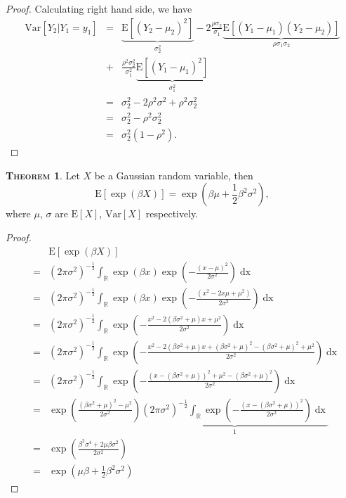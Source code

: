 \documentclass[a4paper, twoside, 11pt]{article}
\theoremstyle{definition}
\newtheorem{theorem}[definition]{\scshape Theorem}
\newcommand{\brkt}[1]{\left({#1} \right)}
\begin{document}
\begin{proof}
  Calculating right hand side, we have
  \begin{eqnarray*}
	\mathrm{Var}[Y_2|Y_1=y_1] &=&\underbrace{\mathrm{E}[(Y_2 - \mu_2)^2]}_{\sigma_2^2} - 2\frac{\rho\sigma_2}{\sigma_1}\underbrace{\mathrm{E}[(Y_1 -\mu_1)(Y_2 - \mu_2)]}_{\rho\sigma_1\sigma_2}\\
	&+& \frac{\rho^2\sigma_2^2}{\sigma_1^2}\underbrace{\mathrm{E}[(Y_1-\mu_1)^2]}_{\sigma_1^2}\\
	&=& \sigma_2^2 - 2\rho^2\sigma^2 + \rho^2\sigma_2^2\\
	&=& \sigma_2^2 - \rho^2\sigma_2^2\\
	&=& \sigma_2^2(1-\rho^2).
  \end{eqnarray*} 
  \end{proof}

  \begin{theorem}
	Let $X$ be a Gaussian random variable, then
	\begin{equation}
	  \mathrm{E}[\exp(\beta X)] = \exp(\beta\mu + \frac{1}{2}\beta^2\sigma^2),
	  \label{sec:expgau}
	\end{equation}
	where $\mu$, $\sigma$ are $\mathrm{E}[X]$, $\mathrm{Var}[X]$ respectively.
  \end{theorem}
  \begin{proof}
  \begin{eqnarray*}
	&&\mathrm{E}[\exp(\beta X)] \\
  &=& (2\pi \sigma^2)^{-\frac{1}{2}}\int_\mathbb{R} \exp(\beta x) \exp\brkt{-\frac{(x-\mu)^2}{2\sigma^2}} \mathop{dx}\\
  &=& (2\pi \sigma^2)^{-\frac{1}{2}}\int_\mathbb{R} \exp(\beta x) \exp\brkt{-\frac{(x^2- 2x\mu+ \mu^2)}{2\sigma^2}} \mathop{dx}\\
  &=& (2\pi \sigma^2)^{-\frac{1}{2}}\int_\mathbb{R} \exp\brkt{-\frac{x^2- 2(\beta\sigma^2+\mu)x+ \mu^2}{2\sigma^2}} \mathop{dx}\\
  &=& (2\pi \sigma^2)^{-\frac{1}{2}}\int_\mathbb{R} \exp\brkt{-\frac{x^2- 2(\beta\sigma^2+\mu)x+ (\beta\sigma^2+\mu)^2 -  (\beta\sigma^2+\mu)^2 + \mu^2}{2\sigma^2}} \mathop{dx}\\
  &=& (2\pi \sigma^2)^{-\frac{1}{2}}\int_\mathbb{R} \exp\brkt{-\frac{(x- (\beta\sigma^2+\mu))^2+ \mu^2 - (\beta\sigma^2+\mu)^2}{2\sigma^2}} \mathop{dx}\\
  &=& \exp\brkt{\frac{(\beta\sigma^2+\mu)^2 - \mu^2}{2\sigma^2}} \underbrace{(2\pi \sigma^2)^{-\frac{1}{2}}\int_\mathbb{R} \exp\brkt{-\frac{(x- (\beta\sigma^2+\mu))^2}{2\sigma^2}}\mathop{dx}}_{1}\\
  &=& \exp\brkt{\frac{\beta^2\sigma^4 + 2\mu\beta\sigma^2}{2\sigma^2}}\\
  &=& \exp(\mu\beta + \frac{1}{2}\beta^2\sigma^2)
  \end{eqnarray*}
  \end{proof}
\end{document}

